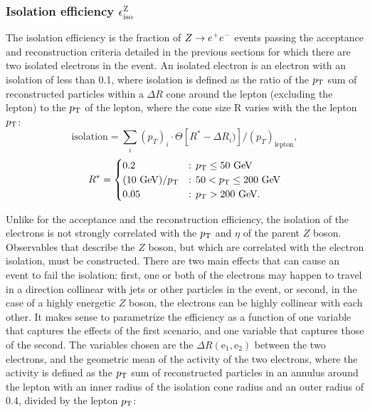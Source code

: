 {\subsubsection{Isolation efficiency $\epsilon^{\text{Z}}_{\text{iso}}$}
The isolation efficiency is the fraction of $Z\rightarrow e^+e^-$ events passing the acceptance and reconstruction criteria detailed in the previous sections for which there are two isolated electrons in the event. An isolated electron is an electron with an isolation of less than 0.1,  where isolation is defined as the ratio of the $p_{\text{T}}$ sum of reconstructed particles within a $\Delta R$ cone around the lepton (excluding the lepton) to the $p_{\text{T}}$ of the lepton, where the cone size R varies with the the lepton $p_{\text{T}}$:
\begin{equation}
\text{isolation} = \sum_{i}(p_{T})_i \cdot \Theta[R^*-\Delta R_{i})]/(p_T)_{\text{lepton}},
\label{eq:isolation}
\end{equation}
\[
R^* = 
  \begin{cases} 
  0.2 & \text{: } p_{\text{T}} \leq 50 \text{ GeV} \\
  (10 \text{ GeV})/p_{\text{T}} & \text{: } 50 < p_{\text{T}} \leq 200 \text{ GeV} \\  
   0.05 & \text{: } p_{\text{T}} > 200 \text{ GeV}. \\
  \end{cases}
\]

Unlike for the acceptance and the reconstruction efficiency, the isolation of the electrons is not strongly correlated with the $p_{\text{T}}$ and $\eta$ of the parent $Z$ boson. Observables that describe the $Z$ boson, but which are correlated with the electron isolation, must be constructed. There are two main effects that can cause an event to fail the isolation: first, one or both of the electrons may happen to travel in a direction collinear with jets or other particles in the event, or second, in the case of a highly energetic $Z$ boson, the electrons can be highly collinear with each other. It makes sense to parametrize the efficiency as a function of one variable that captures the effects of the first scenario, and one variable that captures those of the second. The variables chosen are the $\Delta R (\text{e}_1, \text{e}_2)$ between the two electrons, and the geometric mean of the activity of the two electrons, where the activity is defined as the $p_{\text{T}}$ sum of reconstructed particles in an annulus around the lepton with an inner radius of the isolation cone radius and an outer radius of 0.4, divided by the lepton $p_{\text{T}}$:

}
